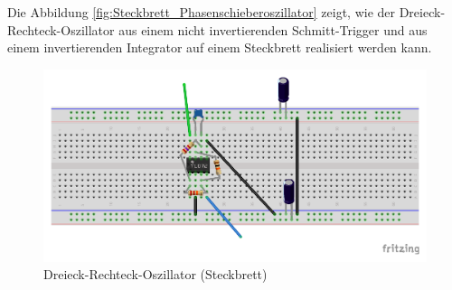 Die Abbildung \ref{fig:Steckbrett_Phasenschieberoszillator} zeigt, wie der Dreieck-Rechteck-Oszillator aus einem nicht invertierenden Schmitt-Trigger und aus einem invertierenden Integrator auf einem Steckbrett realisiert werden kann.

\begin{figure}[H]
  \centering
  \includegraphics[width=0.5\linewidth]{Elektronik-Laborprotokoll_Filter/Abbildungen/Steckbrett_Bilder_Fritzing/Steckbrett_Dreieck_Rechteck.pdf}
  \caption{Dreieck-Rechteck-Oszillator (Steckbrett)}
  \label{fig:Steckbrett_Dreieck-Rechteck-Oszillator}
\end{figure}
































